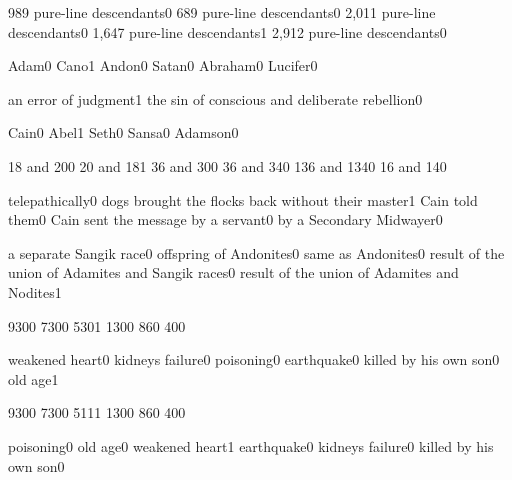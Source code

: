 {989 pure\hyp{}line descendants}{0}
{689 pure\hyp{}line descendants}{0}
{2,011 pure\hyp{}line descendants}{0}
{1,647 pure\hyp{}line descendants}{1}
{2,912 pure\hyp{}line descendants}{0}
\qstop


{Adam}{0}
{Cano}{1}
{Andon}{0}
{Satan}{0}
{Abraham}{0}
{Lucifer}{0}
\qstop


{an error of judgment}{1}
{the sin of conscious and deliberate rebellion}{0}
\qstop

{Cain}{0}
{Abel}{1}
{Seth}{0}
{Sansa}{0}
{Adamson}{0}
\qstop

{18 and 20}{0}
{20 and 18}{1}
{36 and 30}{0}
{36 and 34}{0}
{136 and 134}{0}
{16 and 14}{0}
\qstop

{telepathically}{0}
{dogs brought the flocks back without their master}{1}
{Cain told them}{0}
{Cain sent the message by a servant}{0}
{by a Secondary Midwayer}{0}
\qstop

{a separate Sangik race}{0}
{offspring of Andonites}{0}
{same as Andonites}{0}
{result of the union of Adamites and Sangik races}{0}
{result of the union of Adamites and Nodites}{1}
\qstop

{930}{0}
{730}{0}
{530}{1}
{130}{0}
{86}{0}
{40}{0}
\qstop

{weakened heart}{0}
{kidneys failure}{0}
{poisoning}{0}
{earthquake}{0}
{killed by his own son}{0}
{old age}{1}
\qstop

{930}{0}
{730}{0}
{511}{1}
{130}{0}
{86}{0}
{40}{0}
\qstop

{poisoning}{0}
{old age}{0}
{weakened heart}{1}
{earthquake}{0}
{kidneys failure}{0}
{killed by his own son}{0}
\qstop



